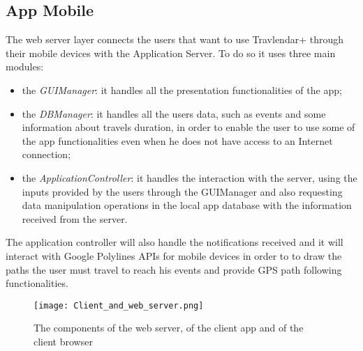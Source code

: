 \subsection{App Mobile}
\label{subsect:App Mobile}
	The web server layer connects the users that want to use Travlendar+ through their mobile devices with the Application Server.
	To do so it uses three main modules: 
	\begin{itemize}
	\item the \textit{GUIManager}: it handles all the presentation functionalities of the app;
	\item the \textit{DBManager}: it handles all the users data, such as events and some information about travels duration, in order to enable the user to use some of the app functionalities even when he does not have access to an Internet connection;
	\item the \textit{ApplicationController}: it handles the interaction with the server, using the inputs provided by the users through the GUIManager and also requesting data manipulation operations in the local app database with the information received from the server.
	\end{itemize}
	The application controller will also handle the notifications received and it will interact with Google Polylines APIs for mobile devices in order to to draw the paths the user must travel to reach his events and provide GPS path following functionalities.
	
	
\begin{figure}[H]
\begin{center}
		\hspace*{-0pt}
		\texttt{[image: Client\_and\_web\_server.png]}
\end{center}
\caption{The components of the web server, of the client app and of the client browser}
\end{figure}